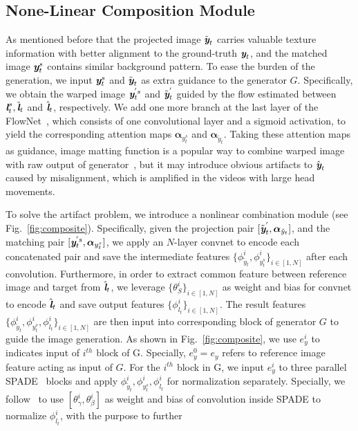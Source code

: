 \documentclass[runningheads]{llncs}
\def\mathbi#1{\textbf{\em #1}}
\begin{document}
\subsection{None-Linear Composition Module} 
\label{subsec:none-linear}
As mentioned before that the projected image $\tilde{\mathbi{y}}_t$ carries valuable texture information with better alignment to the ground-truth $ \mathbi{y}_t$, and the matched image $\mathbi{y}_t^s$ contains similar background pattern. To ease the burden of the generation, we input $\mathbi{y}_t^s$ and $\tilde{\mathbi{y}}_t$ as extra guidance to the generator $G$. Specifically, we obtain the warped image $\mathbi{y}_t^{'s}$ and $\tilde{\mathbi{y}}_t^{'} $ guided by the flow estimated between ${\mathbi{l}}^s_t, {\tilde{\mathbi{l}}}_t$ and ${\hat{\mathbi{l}}}_t$, respectively. We add one more branch at the last layer of the FlowNet~\cite{wang2018vid2vid}, which consists of one convolutional layer and a sigmoid activation, to yield the corresponding attention maps $\boldsymbol{\alpha}_{y_t^s}$ and $\boldsymbol{\alpha}_{\tilde{y}_t}$. Taking these attention maps as guidance, image matting function is a popular way to combine warped image with raw output of generator~\cite{wang2018fewshotvid2vid,wang2018vid2vid,chen2019hierarchical,pumarola2019ganimation}, but it may introduce obvious artifacts to $\hat{\mathbi{y}}_{t}$ caused by misalignment, which is amplified in the videos with large head movements. 

To solve the artifact problem, we introduce a nonlinear combination module (see Fig.~\ref{fig:composite}). Specifically, given the projection pair $[\tilde{\mathbi{y}}_t^{'},\boldsymbol{\alpha}_{\tilde{y}_t}]$, and the matching pair $[\mathbi{y}_t^{'s}, \boldsymbol{\alpha}_{{y}_t^s}]$, we apply an $N$-layer convnet to encode each concatenated pair and save the intermediate features $\{\phi^i_{\tilde{y}_t}, \phi^i_{{y}^s_t}\}_{i \in [1,N]}$ after each convolution. Furthermore, in order to extract common feature between reference image and target from ${\hat{\mathbi{l}}}_t$, we leverage $\{\theta^i_S\}_{i\in [1,N]}$ as weight and bias for convnet to encode ${\hat{\mathbi{l}}}_t$ and save output features $\{\phi^i_{l_t}\}_{i \in [1,N]}$. The result features $\{\phi^i_{\tilde{y}_t}, \phi^i_{{y}^s_t}, \phi^i_{l_t} \}_{i \in [1,N]}$ are then input into corresponding block of generator $G$ to guide the image generation. As shown in Fig.~\ref{fig:composite}, we use $e_y^i$ to indicates input of $i^{th}$ block of G. Specially, $e_y^0=e_y$ refers to reference image feature acting as input of $G$. For the $i^{th}$ block in G, we input $e_y^i$ to three parallel SPADE~\cite{park2019semantic} blocks and apply $\phi^i_{\tilde{y}_t}, \phi^i_{{y}^s_t}, \phi^i_{l_t}$ for normalization separately. Specially, we follow~\cite{wang2018fewshotvid2vid} to use $[\theta_\gamma^i,\theta_\beta^i]$ as weight and bias of convolution inside SPADE to normalize $\phi_{l_t}^i$, with the purpose to further 
\end{document}

